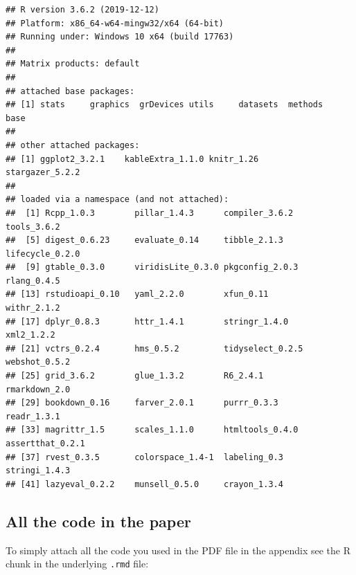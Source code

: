 \documentclass[
  12pt,
]{article}
\begin{document}
\begin{verbatim}
## R version 3.6.2 (2019-12-12)
## Platform: x86_64-w64-mingw32/x64 (64-bit)
## Running under: Windows 10 x64 (build 17763)
## 
## Matrix products: default
## 
## attached base packages:
## [1] stats     graphics  grDevices utils     datasets  methods   base     
## 
## other attached packages:
## [1] ggplot2_3.2.1    kableExtra_1.1.0 knitr_1.26       stargazer_5.2.2 
## 
## loaded via a namespace (and not attached):
##  [1] Rcpp_1.0.3        pillar_1.4.3      compiler_3.6.2    tools_3.6.2      
##  [5] digest_0.6.23     evaluate_0.14     tibble_2.1.3      lifecycle_0.2.0  
##  [9] gtable_0.3.0      viridisLite_0.3.0 pkgconfig_2.0.3   rlang_0.4.5      
## [13] rstudioapi_0.10   yaml_2.2.0        xfun_0.11         withr_2.1.2      
## [17] dplyr_0.8.3       httr_1.4.1        stringr_1.4.0     xml2_1.2.2       
## [21] vctrs_0.2.4       hms_0.5.2         tidyselect_0.2.5  webshot_0.5.2    
## [25] grid_3.6.2        glue_1.3.2        R6_2.4.1          rmarkdown_2.0    
## [29] bookdown_0.16     farver_2.0.1      purrr_0.3.3       readr_1.3.1      
## [33] magrittr_1.5      scales_1.1.0      htmltools_0.4.0   assertthat_0.2.1 
## [37] rvest_0.3.5       colorspace_1.4-1  labeling_0.3      stringi_1.4.3    
## [41] lazyeval_0.2.2    munsell_0.5.0     crayon_1.3.4
\end{verbatim}

\hypertarget{all-the-code-in-the-paper}{%
\subsection{All the code in the paper}\label{all-the-code-in-the-paper}}

To simply attach all the code you used in the PDF file in the appendix see the R chunk in the underlying \texttt{.rmd} file:
\end{document}
